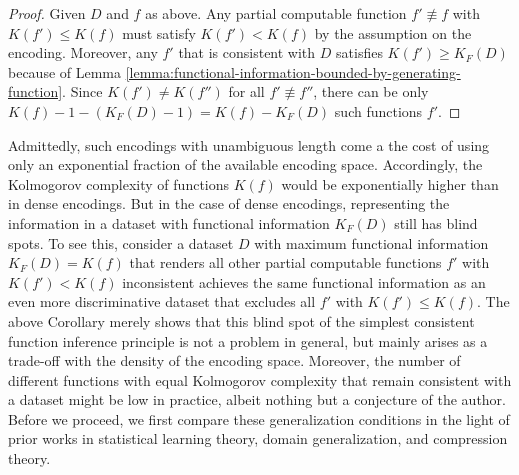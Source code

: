 \begin{proof}
	Given $D$ and $f$ as above.
	Any partial computable function $f'\not\equiv f$ with $K(f')\leq K(f)$ must satisfy $K(f')<K(f)$ by the assumption on the encoding.
	Moreover, any $f'$ that is consistent with $D$ satisfies $K(f')\geq K_F(D)$ because of Lemma \ref{lemma:functional-information-bounded-by-generating-function}.
	Since $K(f')\neq K(f'')$ for all $f'\not\equiv f''$, there can be only $K(f)-1 - (K_F(D) -1)=K(f)-K_F(D)$ such functions $f'$. 
\end{proof}
Admittedly, such encodings with unambiguous length come a the cost of using only an exponential fraction of the available encoding space.
Accordingly, the Kolmogorov complexity of functions $K(f)$ would be exponentially higher than in dense encodings.
But in the case of dense encodings, representing the information in a dataset with functional information $K_F(D)$ still has blind spots.
To see this, consider a dataset $D$ with maximum functional information $K_F(D)=K(f)$ that renders all other partial computable functions $f'$ with $K(f')<K(f)$ inconsistent achieves the same functional information as an even more discriminative dataset that excludes all $f'$ with $K(f')\leq K(f)$.
The above Corollary merely shows that this blind spot of the simplest consistent function inference principle is not a problem in general, but mainly arises as a trade-off with the density of the encoding space.
Moreover, the number of different functions with equal Kolmogorov complexity that remain consistent with a dataset might be low in practice, albeit nothing but a conjecture of the author.
Before we proceed, we first compare these generalization conditions in the light of prior works in statistical learning theory, domain generalization, and compression theory.

